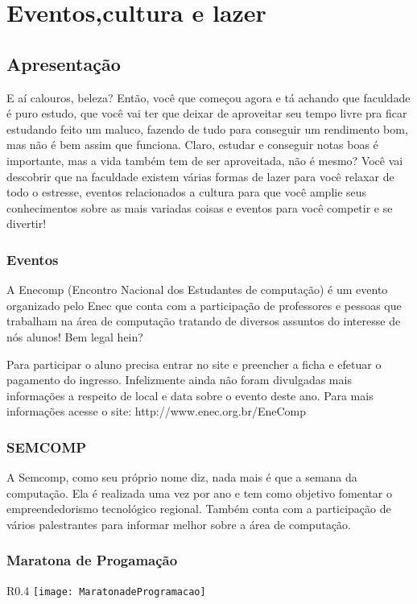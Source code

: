 \chapter{Eventos,cultura e lazer}
\section{Apresentação}

E aí calouros, beleza? Então, você que começou agora e tá achando que faculdade é puro estudo, que você vai ter que deixar de aproveitar seu tempo livre pra ficar estudando feito um maluco, fazendo de tudo para conseguir um rendimento bom, mas não é bem assim que funciona. Claro, estudar e conseguir notas boas é importante, mas a vida também tem de ser aproveitada, não é mesmo? Você vai descobrir que na faculdade existem várias formas de lazer para você relaxar de todo o estresse, eventos relacionados a cultura para que você amplie seus conhecimentos sobre as mais variadas coisas e eventos para você competir e se divertir!     

\subsection{Eventos} 

A Enecomp (Encontro Nacional dos Estudantes de computação) é um evento organizado pelo Enec que conta com a participação de professores e pessoas que trabalham na área de computação tratando de diversos assuntos do interesse de nós alunos! Bem legal hein?

Para participar o aluno precisa entrar no site e preencher a ficha e efetuar o pagamento do ingresso. Infelizmente ainda não foram divulgadas mais informações a respeito de local e data sobre o evento deste ano. Para mais informações acesse o site: http://www.enec.org.br/EneComp

\subsection {SEMCOMP}
A Semcomp, como seu próprio nome diz, nada mais é que a semana da computação. Ela é realizada uma vez por ano e tem como objetivo fomentar o empreendedorismo tecnológico regional. Também conta com a participação de vários palestrantes para informar melhor sobre a área de computação. 

\subsection {Maratona de Progamação}
                \begin{wrapfigure}{R}{0.4\textwidth}
	                    \centering
                        \texttt{[image: MaratonadeProgramacao]}
                     \end{wrapfigure}  

